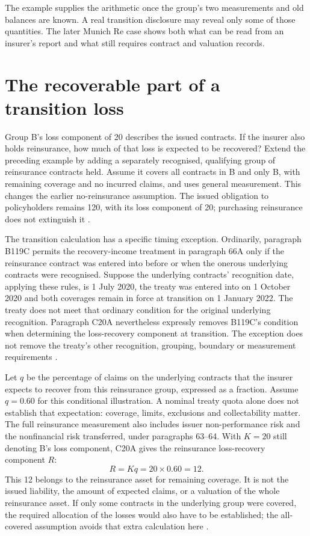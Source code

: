 The example supplies the arithmetic once the group's two measurements and
old balances are known. A real transition disclosure may reveal only some
of those quantities. The later Munich Re case shows both what can be read from an
insurer's report and what still requires contract and valuation records.

\clearpage
\section{The recoverable part of a transition loss}
\label{sec:reinsurance-transition-recovery}

Group B's loss component of 20 describes the issued contracts. If the insurer
also holds reinsurance, how much of that loss is expected to be recovered?
Extend the preceding example by adding a separately recognised, qualifying
group of reinsurance contracts held. Assume it covers all contracts in B and
only B, with remaining coverage and no incurred claims, and uses general
measurement. This changes the earlier no-reinsurance assumption. The issued
obligation to policyholders remains 120, with its loss component of 20;
purchasing reinsurance does not extinguish it
\citep[paragraphs 60--64 and 75]{aasb17}.

The transition calculation has a specific timing exception. Ordinarily,
paragraph B119C permits the recovery-income treatment in paragraph 66A only
if the reinsurance contract was entered into before or when the onerous
underlying contracts were recognised. Suppose the underlying contracts'
recognition date, applying these rules, is 1 July 2020, the treaty was entered
into on 1 October 2020 and
both coverages remain in force at transition on 1 January 2022. The treaty
does not meet that ordinary condition for the original underlying recognition.
Paragraph C20A nevertheless expressly removes B119C's condition when
determining the loss-recovery component at transition. The exception does
not remove the treaty's other recognition, grouping, boundary or measurement
requirements \citep[paragraphs 61--66B, B119C and C20A]{aasb17}.

Let $q$ be the percentage of claims on the underlying contracts that the
insurer expects to recover from this reinsurance group, expressed as a
fraction. Assume $q=0.60$ for this conditional illustration. A nominal treaty
quota alone does not establish that expectation: coverage, limits, exclusions
and collectability matter. The full reinsurance measurement also includes
issuer non-performance risk and the nonfinancial risk transferred, under
paragraphs 63--64. With $K=20$ still denoting B's loss component, C20A gives
the reinsurance loss-recovery component $R$:
\[
 R=Kq=20\times 0.60=12.
\]
This 12 belongs to the reinsurance asset for remaining coverage. It is not
the issued liability, the amount of expected claims, or a valuation of the
whole reinsurance asset. If only some contracts in the underlying group were
covered, the required allocation of the losses would also have to be
established; the all-covered assumption avoids that extra calculation here
\citep[paragraphs 63--64, 66B, B119E and C20A]{aasb17}.

